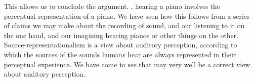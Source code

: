 \documentclass[sloppy, journal, git, bytitle, dodraft]{humapap}
\begin{document}




\sect This allows us to conclude the argument. %
, hearing a piano involves the perceptual representation of a piano. We have seen how this follows from a series of claims we may make about the recording of sound, and our listening to it on the one hand, and our imagining hearing pianos or other things on the other. Source-representationalism is a view about auditory perception, according to which the sources of the sounds humans hear are always represented in their perceptual experience. We have come to see that may very well be a correct view about auditory perception.
\end{document}
